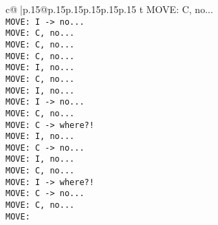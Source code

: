 \documentclass{article}
\begin{document}
{\begin{supertabular}{c@{$\;$}|p{.15\linewidth}@{}p{.15\linewidth}p{.15\linewidth}p{.15\linewidth}p{.15\linewidth}p{.15\linewidth}}
{{{t  MOVE: C, no...\\ \tt  MOVE: I -> no...\\ \tt  MOVE: C, no...\\ \tt  MOVE: C, no...\\ \tt  MOVE: C, no...\\ \tt  MOVE: I, no...\\ \tt  MOVE: C, no...\\ \tt  MOVE: I, no...\\ \tt  MOVE: I -> no...\\ \tt  MOVE: C, no...\\ \tt  MOVE: C -> where?!\\ \tt  MOVE: I, no...\\ \tt  MOVE: C -> no...\\ \tt  MOVE: I, no...\\ \tt  MOVE: C, no...\\ \tt  MOVE: I -> where?!\\ \tt  MOVE: C -> no...\\ \tt  MOVE: C, no...\\ \tt  MOVE: }}}
\end{supertabular}}
\end{document}
